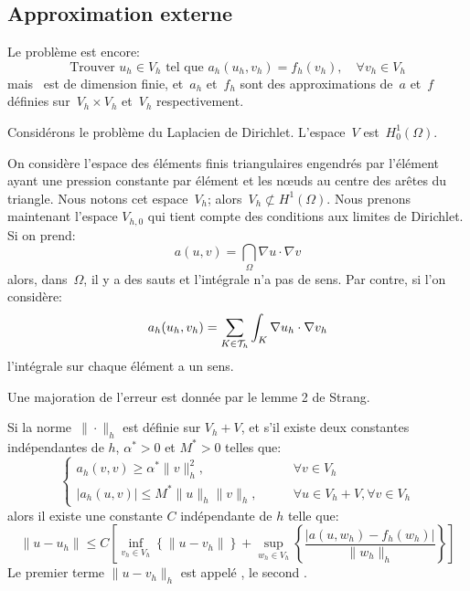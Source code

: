 \medskip
\subsection{Approximation externe}

Le problème est encore:
\begin{equation}
\text{Trouver } u_h\in V_h \text{ tel que } a_h(u_h,v_h) = f_h(v_h),\quad \forall v_h\in V_h
\end{equation}
mais~ est de dimension finie, et~$a_h$ et~$f_h$ sont des approximations de~$a$ et~$f$ définies sur~$V_h\times V_h$ et~$V_h$ respectivement.

\begin{remarque}[Motivation]
Considérons le problème du Laplacien de Dirichlet. L'espace~$V$ est~$H^1_0(\Omega)$.

On considère l'espace des éléments finis triangulaires engendrés par l'élément ayant une pression constante par élément et les nœuds au centre des arêtes du triangle. Nous notons cet espace~$V_h$; alors~$V_h\not\subset H^1(\Omega)$. Nous prenons maintenant l'espace $V_{h,0}$ qui tient compte des conditions aux limites de Dirichlet. Si on prend:
\begin{equation}
a(u,v)=\dint_\Omega \nabla u\cdot \nabla v
\end{equation}
alors, dans~$\Omega$, il y a des sauts et l'intégrale n'a pas de sens. Par contre, si l'on considère:
\begin{equation} 
a_h(u_h,v_h)=\displaystyle\sum_{K\in\mathcal{T}_h}\displaystyle\int_K \nabla u_h\cdot\nabla v_h
\end{equation}
l'intégrale sur chaque élément a un sens.
\end{remarque}

\medskip
Une majoration de l'erreur est donnée par le lemme 2 de Strang.
\begin{lemme}
Si la norme~$\|\cdot\|_h$ est définie sur $V_h+V$, et s'il existe deux constantes indépendantes de $h$, $\alpha^*>0$ et $M^*>0$ telles que:
\[\left\{
\begin{array}{rl}
a_h(v,v)\ge\alpha^*\|v\|^2_h, \qquad &\forall v\in V_h \\[+2mm]
|a_h(u,v)|\le M^*\|u\|_h\|v\|_h, \qquad &\forall u\in V_h+V, \forall v\in V_h
\end{array}
\right.\]
alors il existe une constante $C$ indépendante de $h$ telle que:
\begin{equation}
\|u-u_h\|\le C\left[
\inf_{v_h\in V_h} \left\{ \|u-v_h\|\right\} +
\sup_{w_h\in V_h} \left\{\dfrac{|a(u,w_h)-f_h(w_h)|}{\|w_h\|_h}\right\}
\right]
\end{equation}
Le premier terme $ \|u-v_h\|_h$ est appelé ,
le second .
\end{lemme}



